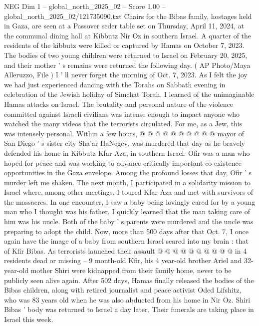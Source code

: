 \begin{textsample}{NEG Dim 1 – global\_north\_2025\_02 – Score 1.00 – global\_north\_2025\_02/121735090.txt}  \label{ex:f1_neg_010}
Chairs for the Bibas family, hostages held in Gaza, are seen at a Passover seder table set on Thursday, April 11, 2024, at the communal dining hall at Kibbutz Nir Oz in southern Israel.
A quarter of the residents of the kibbutz were killed or captured by Hamas on October 7, 2023.
The bodies of two young children were returned to Israel on February 20, 2025, and their mother ' s remains were returned the following day. ( AP Photo/Maya Alleruzzo, File ) I ' ll never forget the morning of Oct. 7, 2023.
As I felt the joy we had just experienced dancing with the Torahs on Sabbath evening in celebration of the Jewish holiday of Simchat Torah, I learned of the unimaginable Hamas attacks on Israel.
The brutality and personal nature of the violence committed against Israeli civilians was intense enough to impact anyone who watched the many videos that the terrorists circulated.
For me, as a Jew, this was intensely personal.
Within a few hours, @ @ @ @ @ @ @ @ @ @ mayor of San Diego ' s sister city Sha'ar HaNegev, was murdered that day as he bravely defended his home in Kibbutz Kfar Aza, in southern Israel.
Ofir was a man who hoped for peace and was working to advance critically important co-existence opportunities in the Gaza envelope.
Among the profound losses that day, Ofir ' s murder left me shaken.
The next month, I participated in a solidarity mission to Israel where, among other meetings, I toured Kfar Aza and met with survivors of the massacres.
In one encounter, I saw a baby being lovingly cared for by a young man who I thought was his father.
I quickly learned that the man taking care of him was his uncle.
Both of the baby ' s parents were murdered and the uncle was preparing to adopt the child.
Now, more than 500 days after that Oct. 7, I once again have the image of a baby from southern Israel seared into my brain : that of Kfir Bibas.
As terrorists launched their assault @ @ @ @ @ @ @ @ @ @ in 4 residents dead or missing -- 9 month-old Kfir, his 4 year-old brother Ariel and 32-year-old mother Shiri were kidnapped from their family home, never to be publicly seen alive again.
After 502 days, Hamas finally released the bodies of the Bibas children, along with retired journalist and peace activist Oded Lifshitz, who was 83 years old when he was also abducted from his home in Nir Oz.
Shiri Bibas ' body was returned to Israel a day later.
Their funerals are taking place in Israel this week.

\end{textsample}
